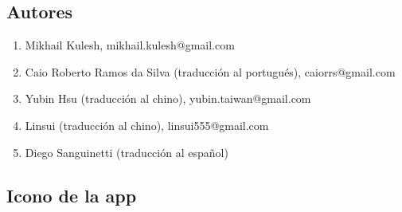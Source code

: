\documentclass[DIV=calc, paper=a4, fontsize=11pt, twocolumn]{scrartcl}
\begin{document}
\subsection{Autores}

\begin{enumerate}
\item Mikhail Kulesh,
mikhail.kulesh@gmail.com

\item Caio Roberto Ramos da Silva (traducción
al portugués),
caiorrs@gmail.com

\item Yubin Hsu (traducción al chino),
yubin.taiwan@gmail.com

\item Linsui (traducción al chino),
linsui555@gmail.com

\item Diego Sanguinetti
(traducción al español)
\end{enumerate}

\subsection{Icono de la app}
\end{document}
